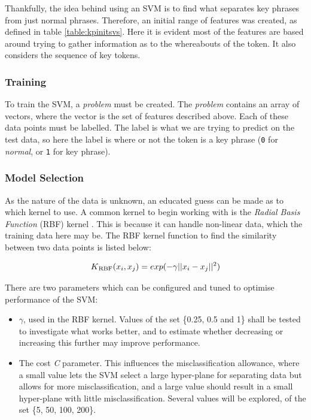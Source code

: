 Thankfully, the idea behind using an SVM is to find what separates key phrases from just normal phrases. Therefore, an initial range of features was created, as defined in table \ref{table:kpinitsvs}. Here it is evident most of the features are based around trying to gather information as to the whereabouts of the token. It also considers the sequence of key tokens.

\subsubsection*{Training}
To train the SVM, a \textit{problem} must be created. The \textit{problem} contains an array of vectors, where the vector is the set of features described above. Each of these data points must be labelled. The label is what we are trying to predict on the test data, so here the label is where or not the token is a key phrase (\texttt{0} for \textit{normal}, or \texttt{1} for key phrase). 

\subsubsection*{Model Selection}
As the nature of the data is unknown, an educated guess can be made as to which kernel to use. A common kernel to begin working with is the \textit{Radial Basis Function} (RBF) kernel \cite{Chih-WeiHsuChih-ChungChang2008}. This is because it can handle non-linear data, which the training data here may be. The RBF kernel function to find the similarity between two data points is listed below:

\begin{equation*}
K\textsubscript{RBF}(x_i, x_j) = exp(-\gamma||x_i - x_j||^2)
\end{equation*}

\noindent There are two parameters which can be configured and tuned to optimise performance of the SVM:
\begin{itemize}
	\item $\gamma$, used in the RBF kernel. Values of the set \{0.25, 0.5 and 1\} shall be tested to investigate what works better, and to estimate whether decreasing or increasing this further may improve performance.
	\item The cost \textit{C} parameter. This influences the misclassification allowance, where a small value lets the SVM select a large hyper-plane for separating data but allows for more misclassification, and a large value should result in a small hyper-plane with little misclassification. Several values will be explored, of the set \{5, 50, 100, 200\}.
\end{itemize}

